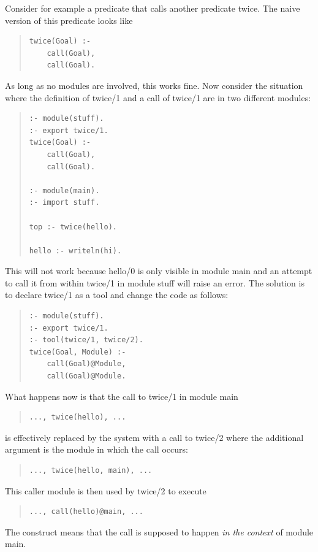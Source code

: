 Consider for example a predicate that calls another predicate twice.
The naive version of this predicate looks like
\begin{quote} \begin{verbatim}
twice(Goal) :-
    call(Goal),
    call(Goal).
\end{verbatim} \end{quote}
As long as no modules are involved, this works fine.
Now consider the situation where the definition of twice/1 and a
call of twice/1 are in two different modules:
\begin{quote} \begin{verbatim}
:- module(stuff).
:- export twice/1.
twice(Goal) :-
    call(Goal),
    call(Goal).

:- module(main).
:- import stuff.

top :- twice(hello).

hello :- writeln(hi).
\end{verbatim} \end{quote}
This will not work because hello/0 is only visible in module main
and an attempt to call it from within twice/1 in module stuff will
raise an error. The solution is to declare twice/1 as a tool and
change the code as follows:
\begin{quote} \begin{verbatim}
:- module(stuff).
:- export twice/1.
:- tool(twice/1, twice/2).
twice(Goal, Module) :-
    call(Goal)@Module,
    call(Goal)@Module.
\end{verbatim} \end{quote}
What happens now is that the call to twice/1 in module main
\begin{quote} \begin{verbatim}
..., twice(hello), ...
\end{verbatim} \end{quote}
is effectively replaced by the system with a call to twice/2 where
the additional argument is the module in which the call occurs:
\begin{quote} \begin{verbatim}
..., twice(hello, main), ...
\end{verbatim} \end{quote}
This caller module is then used by twice/2 to execute
\begin{quote} \begin{verbatim}
..., call(hello)@main, ...
\end{verbatim} \end{quote}
The 
 construct means that the call is supposed to happen
{\em in the context} of module main.


